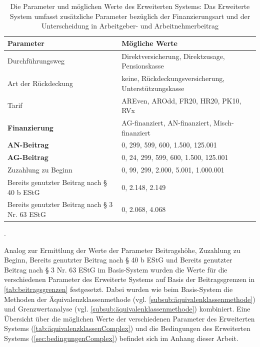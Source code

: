 \begin{table}[htb!]
\footnotesize
\begin{tabularx}{\textwidth}{|X|l|}
\hline
\cellcolor{grauinfo}Parameter                                      & \cellcolor{grauinfo}Mögliche Werte                                       \\ \hline
Durchführungsweg                               & Direktversicherung, Direktzusage, Pensionskasse      \\ \hline
Art der Rückdeckung                            & keine, Rückdeckungsversicherung, Unterstützungskasse \\ \hline
Tarif                                          & AREven, AROdd, FR20, HR20, PK10, RVx                 \\ \hline
\textbf{Finanzierung}								   &AG-finanziert, AN-finanziert, Misch-finanziert     \\ \hline
\textbf{AN-Beitrag}                                    & 0, 299, 599, 600, 1.500, 125.001                     \\ \hline
\textbf{AG-Beitrag }                                    & 0, 24, 299, 599, 600, 1.500, 125.001                   \\ \hline
Zuzahlung zu Beginn                            & 0, 99, 299, 2.000, 5.001, 1.000.001                  \\ \hline
Bereits genutzter Beitrag nach § 40 b EStG     & 0, 2.148, 2.149                                      \\ \hline
Bereits genutzter Beitrag nach § 3 Nr. 63 EStG & 0, 2.068, 4.068                                      \\ \hline
\end{tabularx}
\normalsize
\caption{Die Parameter und möglichen Werte des Erweiterten Systems: Das Erweiterte System umfasst zusätzliche Parameter bezüglich der Finanzierungsart und der Unterscheidung in Arbeitgeber- und Arbeitnehmerbeitrag}.
\label{tab:sutComplex}
\end{table}

Analog zur Ermittlung der Werte der Parameter Beitragshöhe, Zuzahlung zu Beginn, Bereits genutzter Beitrag nach § 40 b EStG und Bereits genutzter Beitrag nach § 3 Nr. 63 EStG im Basis-System wurden die Werte für die verschiedenen Parameter des Erweiterte Systems auf Basis der Beitragsgrenzen in \autoref{tab:beitragsgrenzen} festgesetzt. Dabei wurden wie beim Basis-System die Methoden der Äquivalenzklassenmethode (vgl. \autoref{subsub:äquivalenklassenmethode}) und Grenzwertanalyse (vgl. \autoref{subsub:äquivalenklassenmethode}) kombiniert. Eine Übersicht über die möglichen Werte der verschiedenen Parameter des Erweiterten Systems (\autoref{tab:äquivalenzklassenComplex}) und die Bedingungen des Erweiterten Systems (\autoref{sec:bedingungenComplex}) befindet sich im Anhang dieser Arbeit.

